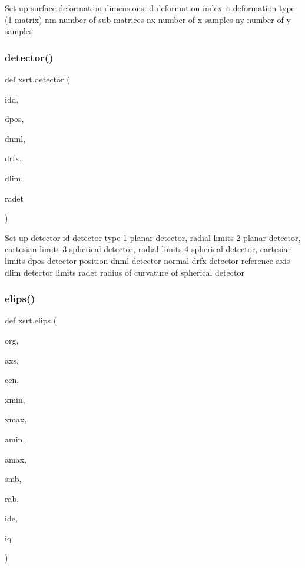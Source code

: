 \begin{DoxyVerb}Set up surface deformation dimensions
    id       deformation index
    it       deformation type (1 matrix)
    nm       number of sub-matrices
    nx       number of x samples
    ny       number of y samples
\end{DoxyVerb}
 \mbox{\label{namespacexsrt_a8c5bd2836e85e10368922546227e6e21}} 
\subsubsection{\texorpdfstring{detector()}{detector()}}
{\footnotesize\ttfamily def xsrt.\+detector (\begin{DoxyParamCaption}\item[{}]{idd,  }\item[{}]{dpos,  }\item[{}]{dnml,  }\item[{}]{drfx,  }\item[{}]{dlim,  }\item[{}]{radet }\end{DoxyParamCaption})}

\begin{DoxyVerb}Set up detector
    id        detector type
               1 planar detector, radial limits
               2 planar detector, cartesian limits
               3 spherical detector, radial limits
               4 spherical detector, cartesian limits
    dpos      detector position
    dnml      detector normal
    drfx      detector reference axis
    dlim      detector limits
    radet     radius of curvature of spherical detector
\end{DoxyVerb}
 \mbox{\label{namespacexsrt_af0348f1498b804fc7bf1cc3f8b7d385d}} 
\subsubsection{\texorpdfstring{elips()}{elips()}}
{\footnotesize\ttfamily def xsrt.\+elips (\begin{DoxyParamCaption}\item[{}]{org,  }\item[{}]{axs,  }\item[{}]{cen,  }\item[{}]{xmin,  }\item[{}]{xmax,  }\item[{}]{amin,  }\item[{}]{amax,  }\item[{}]{smb,  }\item[{}]{rab,  }\item[{}]{ide,  }\item[{}]{iq }\end{DoxyParamCaption})}

